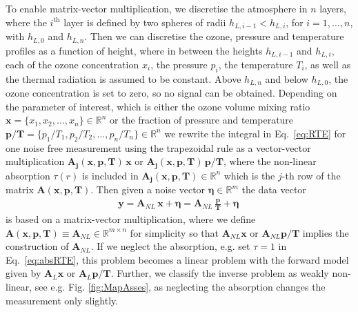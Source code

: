 To enable matrix-vector multiplication, we discretise the atmosphere in $n$ layers, where the $i^\text{th}$ layer is defined by two spheres of radii $h_{L,i-1} < h_{L,i}$, for $i = 1, \dots, n$, with $h_{L,0}$ and $h_{L,n} $.
Then we can discretise the ozone, pressure and temperature profiles as a function of height, where in between the heights $h_{L,i-1}$ and $h_{L,i}$, each of the ozone concentration $x_{i}$, the pressure $p_{i}$, the temperature $T_{i}$, as well as the thermal radiation is assumed to be constant.
Above $h_{L, n}$ and below $h_{L,0} $, the ozone concentration is set to zero, so no signal can be obtained.
Depending on the parameter of interest, which is either the ozone volume mixing ratio $\bm{x} =\{x_1,x_2,\ldots,x_n\} \in \mathbb{R}^{n}$ or the fraction of pressure and temperature $\bm{p/T}= \{p_1/T_1,p_2/T_2,\ldots,p_n/T_n\} \in \mathbb{R}^{n} $
we rewrite the integral in Eq.~\eqref{eq:RTE} for one noise free measurement using the trapezoidal rule as a vector-vector multiplication $\bm{A_{j}}(\bm{x},  \bm{p},\bm{T}) \, \bm{x} $ or $\bm{A_{j}}(\bm{x},  \bm{p},\bm{T}) \, \bm{p}/ \bm{T} $, where the non-linear absorption $\tau(r)$ is included in $\bm{A_{j}}(\bm{x},  \bm{p},\bm{T}) \in \mathbb{R}^{n}$ which is the $j$-th row of the matrix $\bm{A}(\bm{x},  \bm{p},\bm{T})$.
Then given a noise vector $\bm{\eta} \in \mathbb{R}^{m}$ the data vector
\begin{align}
	\bm{y} = \bm{A}_{NL} \, \bm{x} + \bm{\eta}= \bm{A}_{NL} \,
	\frac{ \bm{p}}{\bm{T}} + \bm{\eta} \, 
\end{align}
is based on a matrix-vector multiplication, where we define $\bm{A}(\bm{x},  \bm{p},\bm{T}) \equiv \bm{A}_{NL} \in \mathbb{R}^{m \times n}$ for simplicity so that $\bm{A}_{NL}\bm{x}$ or $\bm{A}_{NL}\bm{p}/\bm{T}$ implies the construction of $\bm{A}_{NL}$.
If we neglect the absorption, e.g. set $\tau = 1$ in Eq.~\eqref{eq:absRTE}, this problem becomes a linear problem with the forward model given by $\bm{A}_{L}\bm{x}$ or $\bm{A}_{L}\bm{p}/\bm{T}$. 
Further, we classify the inverse problem as weakly non-linear, see e.g. Fig. \ref{fig:MapAsses}, as neglecting the absorption changes the measurement only slightly.




